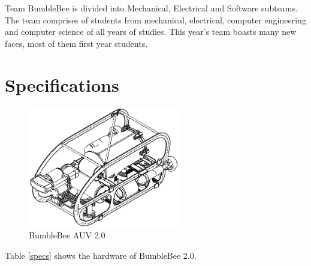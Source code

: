 \documentclass[journal,12pt]{IEEEtran}
\begin{document}
Team BumbleBee is divided into Mechanical, Electrical and Software subteams. The team comprises of students from mechanical, electrical, computer engineering and computer science of all years of studies. This year's team boasts many new faces, most of them first year students. 

\section{Specifications}

\begin{figure}[h]
\centering
\includegraphics[width=2.6in]{BBAUV.png}
\caption{BumbleBee AUV 2.0}
\end{figure}

Table \ref{specs} shows the hardware of BumbleBee 2.0.
\end{document}
